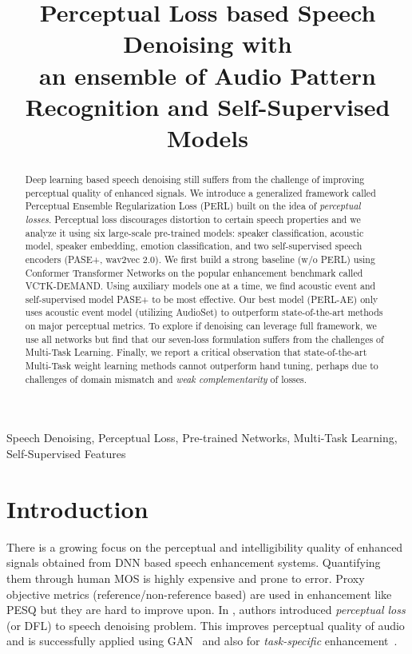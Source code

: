 \documentclass{article}
\title{Perceptual Loss based Speech Denoising with\\an ensemble of Audio Pattern Recognition and Self-Supervised Models}
\begin{document}
\ninept
\maketitle
\begin{abstract}
Deep learning based speech denoising still suffers from the challenge of improving perceptual quality of enhanced signals.
We introduce a generalized framework called Perceptual Ensemble Regularization Loss (PERL) built on the idea of \emph{perceptual losses}.
Perceptual loss discourages distortion to certain speech properties and we analyze it using six large-scale pre-trained models: speaker classification, acoustic model, speaker embedding, emotion classification, and two self-supervised speech encoders (PASE+, wav2vec 2.0).
We first build a strong baseline (w/o PERL) using Conformer Transformer Networks on the popular enhancement benchmark called VCTK-DEMAND.
Using auxiliary models one at a time, we find acoustic event and self-supervised model PASE+ to be most effective.
Our best model (PERL-AE) only uses acoustic event model (utilizing AudioSet) to outperform state-of-the-art methods on major perceptual metrics.
To explore if denoising can leverage full framework, we use all networks but find that our seven-loss formulation suffers from the challenges of Multi-Task Learning.
Finally, we report a critical observation that state-of-the-art Multi-Task weight learning methods cannot outperform hand tuning, perhaps due to challenges of domain mismatch and \emph{weak complementarity} of losses.
\end{abstract}
\begin{keywords}
Speech Denoising, Perceptual Loss, Pre-trained Networks, Multi-Task Learning, Self-Supervised Features
\end{keywords}
\section{Introduction}
There is a growing focus on the perceptual and intelligibility quality of enhanced signals obtained from \ac{DNN} based speech enhancement systems.
Quantifying them through human \ac{MOS} is highly expensive and prone to error.
Proxy objective metrics (reference/non-reference based) are used in enhancement like \ac{PESQ} but they are hard to improve upon.
In \cite{germain2018speech}, authors introduced \emph{perceptual loss} (or \ac{DFL}) to speech denoising problem.
This improves perceptual quality of audio and is successfully applied using \ac{GAN}~\cite{su2020hifi} and also for \emph{task-specific} enhancement~\cite{kataria2020analysis}.
\end{document}
